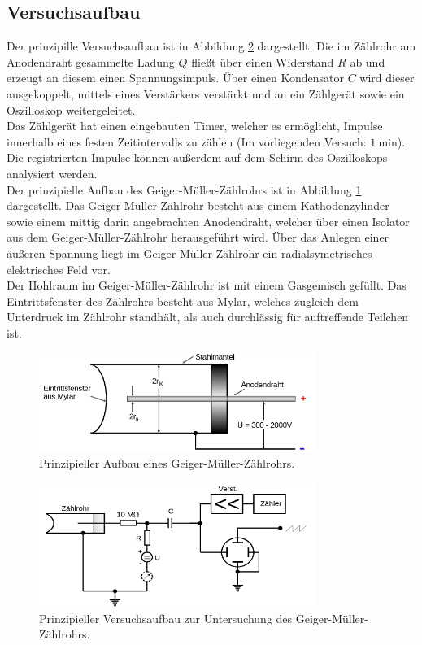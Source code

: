 \subsection{Versuchsaufbau}
\label{sec:Versuchsaufbau}
Der prinzipille Versuchsaufbau ist in Abbildung \ref{fig:aufbau} dargestellt.
Die im Zählrohr am Anodendraht gesammelte Ladung $Q$ fließt über einen Widerstand $R$ ab und erzeugt an diesem einen Spannungsimpuls. Über einen Kondensator $C$ wird dieser ausgekoppelt, mittels eines Verstärkers verstärkt und an ein Zählgerät sowie ein Oszilloskop weitergeleitet.\\
Das Zählgerät hat einen eingebauten Timer, welcher es ermöglicht, Impulse innerhalb eines festen Zeitintervalls zu zählen (Im vorliegenden Versuch: $\SI{1}{\minute}$).
Die registrierten Impulse können außerdem auf dem Schirm des Oszilloskops analysiert werden.\\
Der prinzipielle Aufbau des Geiger-Müller-Zählrohrs ist in Abbildung \ref{fig:geige} dargestellt.
Das Geiger-Müller-Zählrohr besteht aus einem Kathodenzylinder sowie einem mittig darin angebrachten Anodendraht, welcher über einen Isolator aus dem Geiger-Müller-Zählrohr herausgeführt wird.
Über das Anlegen einer äußeren Spannung liegt im Geiger-Müller-Zählrohr ein radialsymetrisches elektrisches Feld vor.\\
Der Hohlraum im Geiger-Müller-Zählrohr ist mit einem Gasgemisch gefüllt.
Das Eintrittsfenster des Zählrohrs besteht aus Mylar, welches zugleich dem Unterdruck im Zählrohr standhält, als auch durchlässig für auftreffende Teilchen ist.

\begin{figure}
  \centering
  \includegraphics[width=0.8\textwidth]{Bilder/endfenster.png}
  \caption{Prinzipieller Aufbau eines Geiger-Müller-Zählrohrs. \cite{Anleitung}}
  \label{fig:geige}
\end{figure}



\begin{figure}
  \centering
  \includegraphics[width=0.8\textwidth]{Bilder/aufbau.png}
  \caption{Prinzipieller Versuchsaufbau zur Untersuchung des Geiger-Müller-Zählrohrs. \cite{Anleitung}}
  \label{fig:aufbau}
\end{figure}
